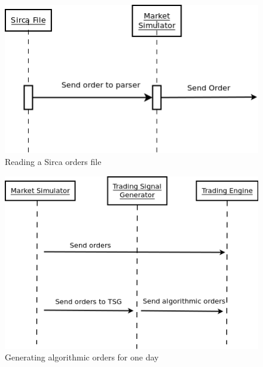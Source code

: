 \documentclass{article}
\begin{document}
\begin{figure}
  \centering
  \includegraphics[width=\textwidth]{sequencediagram1}
  \caption{Reading a Sirca orders file}
\end{figure}

\begin{figure}
  \centering
  \includegraphics[width=\textwidth]{sequencediagram2}
  \caption{Generating algorithmic orders for one day}
\end{figure}
\end{document}
